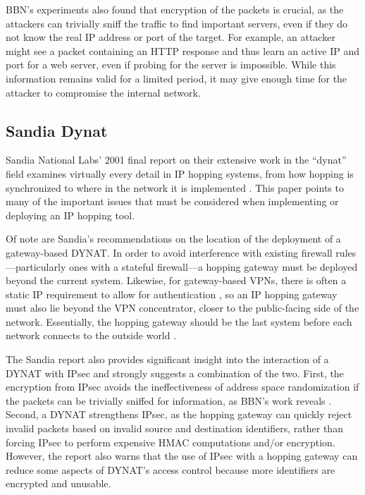 \par BBN's experiments also found that encryption of the packets is crucial, as the attackers can trivially sniff the traffic to find important servers, even if they do not know the real IP address or port of the target. For example, an attacker might see a packet containing an \ac{HTTP} response and thus learn an active IP and port for a web server, even if probing for the server is impossible. While this information remains valid for a limited period, it may give enough time for the attacker to compromise the internal network.

\subsection{Sandia Dynat}
\par Sandia National Labs' 2001 final report on their extensive work in the ``dynat'' field examines virtually every detail in \ac{IP} hopping systems, from how hopping is synchronized to where in the network it is implemented \cite{SandiaDynat}. This paper points to many of the important issues that must be considered when implementing or deploying an \ac{IP} hopping tool.

\par Of note are Sandia's recommendations on the location of the deployment of a gateway-based \ac{DYNAT}. In order to avoid interference with existing firewall rules---particularly ones with a stateful firewall---a hopping gateway must be deployed beyond the current system. Likewise, for gateway-based \acp{VPN}, there is often a static \ac{IP} requirement to allow for authentication \cite{SandiaDynat}, so an \ac{IP} hopping gateway must also lie beyond the \ac{VPN} concentrator, closer to the public-facing side of the network. Essentially, the hopping gateway should be the last system before each network connects to the outside world \cite{SandiaDynat}.

\par The Sandia report also provides significant insight into the interaction of a \ac{DYNAT} with \ac{IPsec} and strongly suggests a combination of the two. First, the encryption from \ac{IPsec} avoids the ineffectiveness of address space randomization if the packets can be trivially sniffed for information, as BBN's work reveals \cite{BBNDYNAT}. Second, a \ac{DYNAT} strengthens \ac{IPsec}, as the hopping gateway can quickly reject invalid packets based on invalid source and destination identifiers, rather than forcing IPsec to perform expensive \ac{HMAC} computations and/or encryption. However, the report also warns that the use of IPsec with a hopping gateway can reduce some aspects of \ac{DYNAT}'s access control because more identifiers are encrypted and unusable.

